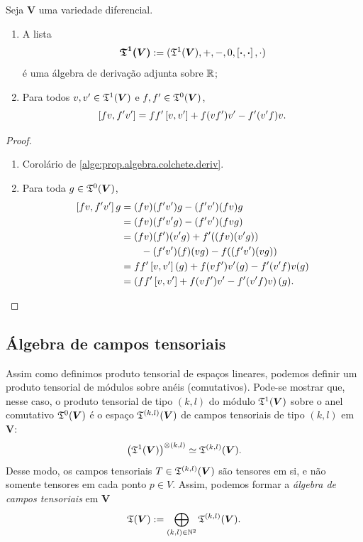 \begin{proposition}
Seja $\bm V$ uma variedade diferencial.
	\begin{enumerate}
	\item A lista
		\begin{equation*}
		\bm{\mathfrak{T}^1(\bm V)} := (\mathfrak{T}^1(\bm V),+,-,0,\left[{\bm{\cdot}},{\bm{\cdot}}\right],\cdot)
		\end{equation*}
	é uma álgebra de derivação adjunta sobre $\mathbb{R}$;
	\item Para todos $v,v' \in \mathfrak{T}^1(\bm V)$ e $f,f' \in \mathfrak{T}^0(\bm V)$,
		\begin{equation*}
		\left[{fv},{f'v'}\right] = ff'\left[{v},{v'}\right] + f(vf')v' - f'(v'f)v.
		\end{equation*}
	\end{enumerate}
\end{proposition}
\begin{proof}
	\begin{enumerate}
	\item Corolário de \ref{alge:prop.algebra.colchete.deriv}.
	\item Para toda $g \in \mathfrak{T}^0(\bm V)$,
		\begin{align*}
		\left[{fv},{f'v'}\right]g &= (fv)(f'v')g - (f'v')(fv)g \\
			&= (fv)(f'v'g) - (f'v')(fvg) \\
			&= (fv)(f')(v'g) + f'((fv)(v'g)) \\
			&\qquad - (f'v')(f)(vg) - f((f'v')(vg)) \\
			&= ff'\left[{v},{v'}\right](g) + f(vf')v'(g) - f'(v'f)v(g) \\
			&= \left(ff'\left[{v},{v'}\right] + f(vf')v' - f'(v'f)v\right)(g).
		\end{align*}
	\end{enumerate}
\end{proof}

\subsection{Álgebra de campos tensoriais}

Assim como definimos produto tensorial de espaços lineares, podemos definir um produto tensorial de módulos sobre anéis (comutativos). Pode-se mostrar que, nesse caso, o produto tensorial de tipo $(k,l)$ do módulo $\mathfrak{T}^1(\bm V)$ sobre o anel comutativo $\mathfrak{T}^0(\bm V)$ é o espaço $\mathfrak{T}^{(k,l)}(\bm V)$ de campos tensoriais de tipo $(k,l)$ em $\bm V$:
	\begin{equation*}
	\left(\mathfrak{T}^1(\bm V)\right)^{\otimes (k,l)} \simeq \mathfrak{T}^{(k,l)}(\bm V).
	\end{equation*}
Desse modo, os campos tensoriais $T \in \mathfrak{T}^{(k,l)}(\bm V)$ são tensores em si, e não somente tensores em cada ponto $p \in V$. Assim, podemos formar a \emph{álgebra de campos tensoriais} em $\bm V$
	\begin{equation*}
	\mathfrak{T} (\bm V) := \bigoplus_{(k,l) \in \mathbb{N}^2} \mathfrak{T}^{(k,l)}(\bm V).
	\end{equation*}

